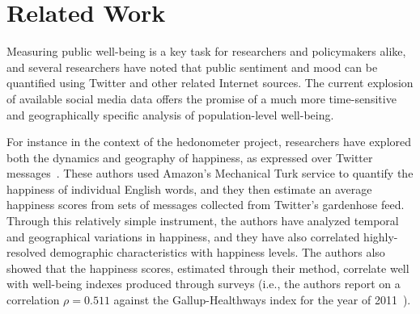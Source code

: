 \documentclass{acm_proc_article-sp}
\begin{document}
\section{Related Work}

Measuring public well-being is a key task for researchers and policymakers alike, and several researchers have noted that public sentiment and mood can be quantified using Twitter and other related Internet sources. The current explosion of available social media data offers the promise of a much more time-sensitive and geographically specific analysis of population-level well-being.

For instance in the context of the hedonometer project, researchers have explored both the dynamics and geography of happiness, as expressed over Twitter messages~\cite{Dodds:2011:Tweets,Mitchell:2013:Tweets,Frank:2013:Tweets}. These authors used Amazon's Mechanical Turk service to quantify the happiness of individual English words, and they then estimate an average happiness scores from sets of messages collected from Twitter’s gardenhose feed. Through this relatively simple instrument, the authors have analyzed temporal and geographical variations in happiness, and they have also correlated highly-resolved demographic characteristics with happiness levels. The authors also showed that the happiness scores, estimated through their method, correlate well with well-being indexes produced through surveys (i.e., the authors report on a correlation $\rho = 0.511$ against the Gallup-Healthways index for the year of 2011~\cite{Mitchell:2013:Tweets}).
\end{document}
